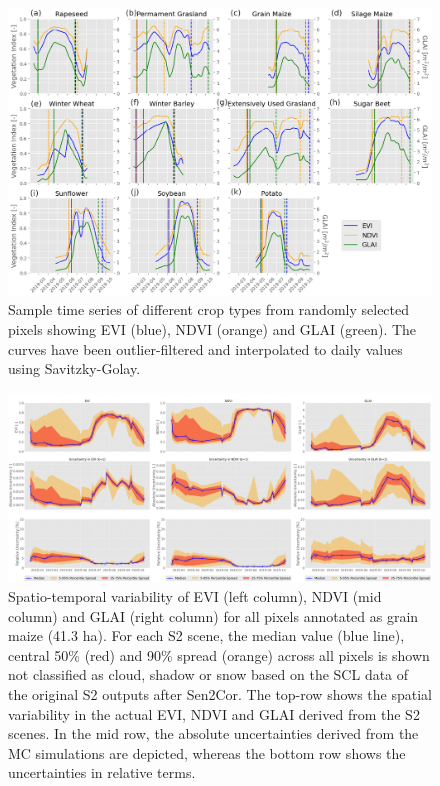 \begin{figure}[H]
    \centering
    \includegraphics[width=\textwidth]{04-Uncertainty/img/130513_130438_sample_time_series.png}
    \caption{Sample time series of different crop types from randomly selected pixels showing EVI (blue), NDVI (orange) and GLAI (green). The curves have been outlier-filtered and interpolated to daily values using Savitzky-Golay.}
    \label{fig:sample_ts_pixels}
\end{figure}

\begin{figure}[H]
    \centering
    \includegraphics[width=\textwidth]{04-Uncertainty/img/Corn_all-pixels-uncertainty-timeseries.png}
    \caption{Spatio-temporal variability of EVI (left column), NDVI (mid column) and GLAI (right column) for all pixels annotated as grain maize (41.3 ha). For each S2 scene, the median value (blue line), central 50\% (red) and 90\% spread (orange) across all pixels is shown not classified as cloud, shadow or snow based on the SCL data of the original S2 outputs after Sen2Cor. The top-row shows the spatial variability in the actual EVI, NDVI and GLAI derived from the S2 scenes. In the mid row, the absolute uncertainties derived from the MC simulations are depicted, whereas the bottom row shows the uncertainties in relative terms.}
    \label{fig:grain-maize-timeseries-and-uncertainty}
\end{figure}

